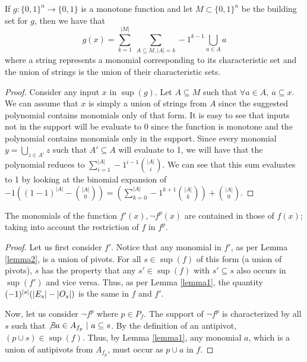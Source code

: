 \begin{lemma}\label{lemma2}
	If $g:\{0, 1\}^n \rightarrow \{0, 1\}$ is a monotone function and let $M \subset \{0,1\}^n$ be the building set for $g$, then we have that $$g(x) = \sum_{k=1}^{|M|} \ \sum_{A \subseteq M, |A| = k} -1^{k-1} \bigcup_{a \in A} a$$ where a string represents a monomial corresponding to its characteristic set and the union of strings is the union of their characteristic sets.

	\begin{proof}
		Consider any input $x$ in $\sup(g)$. Let $A \subseteq M$ such that $\forall a \in A, \ a \subseteq x$. We can assume that $x$ is simply a union of strings from $A$ since the suggested polynomial contains monomials only of that form. It is easy to see that inputs not in the support will be evaluate to $0$ since the function is monotone and the polynomial contains monomials only in the support. Since every monomial $y = \bigcup_{z \in A'}z$ such that $A' \subseteq A$ will evaluate to 1, we will have that the polynomial reduces to $\sum_{i=1}^{|A|} -1^{i-1} \binom{|A|}{i}$. We can see that this sum evaluates to 1 by looking at the binomial expansion of  \\ $ -1((1 - 1)^{|A|} - \binom{|A|}{0}) = (\sum_{k = 0}^{|A|} -1^{k+1} \binom{|A|}{k}) + \binom{|A|}{0}$.
	\end{proof}

\end{lemma}

\begin{proposition}\label{prop2}
	The monomials of the function $f'(x), \neg f^p(x)$ are contained in those of $f(x)$; taking into account the restriction of $f$ in $f^p$. 
	\begin{proof}
		Let us first consider $f'$. Notice that any monomial in $f'$, as per Lemma \ref{lemma2}, is a union of pivots. For all $s \in \sup(f)$ of this form (a union of pivots), $s$ has the property that any $s' \in \sup(f)$ with $s' \subseteq s$ also occurs in $\sup(f')$ and vice versa. Thus, as per Lemma \ref{lemma1}, the quantity $(-1)^{\vert s\vert}(\vert E_s\vert - \vert O_s\vert)$ is the same in $f$ and $f'$. 

		Now, let us consider $\neg f^p$ where $p \in P_f$. The support of $\neg f^p$ is characterized by all $s$ such that $\not \exists a \in A_{f_p} \ | \ a \subseteq s$. By the definition of an antipivot, $(p \cup s) \in \sup(f)$. Thus, by Lemma \ref{lemma1}, any monomial $a$, which is a union of antipivots from $A_{f_p}$, must occur as $p \cup a$ in $f$. 
	\end{proof}
\end{proposition}


